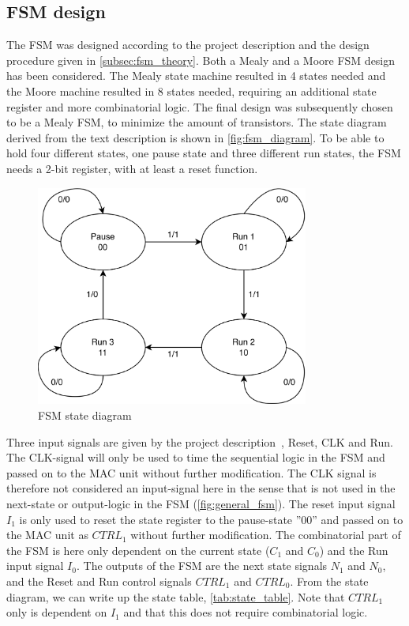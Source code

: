\subsection{FSM design}

The FSM was designed according to the project description and the design procedure given in \autoref{subsec:fsm_theory}. Both a Mealy and a Moore FSM design has been considered. The Mealy state machine resulted in 4 states needed and the Moore machine resulted in 8 states needed, requiring an additional state register and more combinatorial logic. The final design was subsequently chosen to be a Mealy FSM, to minimize the amount of transistors. The state diagram derived from the text description is shown in \autoref{fig:fsm_diagram}. To be able to hold four different states, one pause state and three different run states, the FSM needs a 2-bit register, with at least a reset function. 

\begin{figure}[H]
    \centering
    \includegraphics[width=0.8\textwidth]{Figures/FSM-diagram.png}
    \caption{FSM state diagram}
    \label{fig:fsm_diagram}
\end{figure}

Three input signals are given by the project description~\cite{project_description}, Reset, CLK and Run. The CLK-signal
will only be used to time the sequential logic in the FSM and passed on to the MAC unit without
further modification. The CLK signal is therefore not considered an input-signal here in the sense that is not used in the next-state or output-logic in the FSM (\autoref{fig:general_fsm}). The reset input signal $I_1$ is only used to reset the state register to the pause-state ''00'' and passed on to the MAC unit as $CTRL_1$ without further modification. The combinatorial part of the FSM is here only dependent on the current state ($C_1$ and $C_0$) and the Run input signal $I_0$. The outputs of the FSM are the next state signals $N_1$ and $N_0$, and the Reset and Run control signals $CTRL_1$ and $CTRL_0$. From the state diagram, we can write up the state table, \autoref{tab:state_table}. Note that $CTRL_1$ only is dependent on $I_1$ and that this does not require combinatorial logic.

